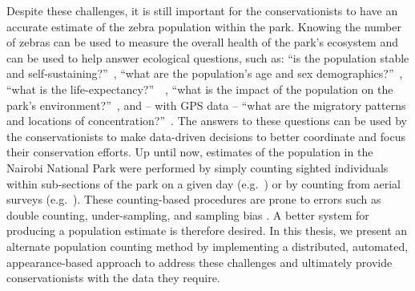 Despite these challenges, it is still important for the conservationists to have an accurate estimate of the zebra population within the park.  Knowing the number of zebras can be used to measure the overall health of the park's ecosystem and can be used to help answer ecological questions, such as: ``is the population stable and self-sustaining?''\ \cite{andersen_population_2015, boyce_population_1992, coulson_use_2001, macedo_ecology_2010}, ``what are the population's age and sex demographics?''\ \cite{romer_population_2015, macedo_ecology_2010}, ``what is the life-expectancy?''\ \ \cite{romer_population_2015, macedo_ecology_2010, white_program_1999}, ``what is the impact of the population on the park's environment?''\ \cite{keesing_impacts_1998, macedo_ecology_2010}, and -- with GPS data -- ``what are the migratory patterns and locations of concentration?''\ \cite{karanth_estimating_2012, subedi_population_2013}.  The answers to these questions can be used by the conservationists to make data-driven decisions to better coordinate and focus their conservation efforts.  Up until now, estimates of the population in the Nairobi National Park were performed by simply counting sighted individuals within sub-sections of the park on a given day (e.g.\ \cite{oconnell_abundance_2011, seber_estimation_1982, subedi_population_2013}) or by counting from aerial surveys (e.g.\ \cite{caughley_sampling_1977, melville_aerial_2008, zero_monitoring_2013}). These counting-based procedures are prone to errors such as double counting, under-sampling, and sampling bias \cite{buckland_quantifying_1991, graham_investigating_1989, jachmann_comparison_2002, jolly_problem_1983, robson_sample_1964}.  A better system for producing a population estimate is therefore desired.  In this thesis, we present an alternate population counting method by implementing a distributed, automated, appearance-based approach to address these challenges and ultimately provide conservationists with the data they require.

